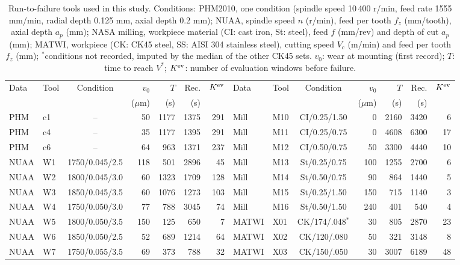 \begin{table}[!tbp]
\centering
\caption{Run-to-failure tools used in this study. Conditions: PHM2010, one condition (spindle speed 10\,400 r/min, feed rate 1555 mm/min, radial depth 0.125 mm, axial depth 0.2 mm); NUAA, spindle speed $n$ (r/min), feed per tooth $f_z$ (mm/tooth), axial depth $a_p$ (mm); NASA milling, workpiece material (CI: cast iron, St: steel), feed $f$ (mm/rev) and depth of cut $a_p$ (mm); MATWI, workpiece (CK: CK45 steel, SS: AISI 304 stainless steel), cutting speed $V_c$ (m/min) and feed per tooth $f_z$ (mm); $^\ast$conditions not recorded, imputed by the median of the other CK45 sets. $v_0$: wear at mounting (first record); $T$: time to reach $V^\ast$; $K^{\rm ev}$: number of evaluation windows before failure.}
\label{tab:data}
\scriptsize\setlength{\tabcolsep}{3.2pt}
\begin{tabular}{llcrrrr@{\hspace{10pt}}llcrrrr}
\toprule
Data & Tool & Condition & $v_0$ & $T$ & Rec. & $K^{\rm ev}$ & Data & Tool & Condition & $v_0$ & $T$ & Rec. & $K^{\rm ev}$\\
 & & & ($\mu$m) & (s) & (s) & & & & & ($\mu$m) & (s) & (s) & \\
\midrule
PHM & c1 & -- & 50 & 1177 & 1375 & 291 & Mill & M10 & CI/0.25/1.50 & 0 & 2160 & 3420 & 6\\
PHM & c4 & -- & 35 & 1177 & 1395 & 291 & Mill & M11 & CI/0.25/0.75 & 0 & 4608 & 6300 & 17\\
PHM & c6 & -- & 64 & 963 & 1371 & 237 & Mill & M12 & CI/0.50/0.75 & 50 & 3300 & 4440 & 10\\
NUAA & W1 & 1750/0.045/2.5 & 118 & 501 & 2896 & 45 & Mill & M13 & St/0.25/0.75 & 100 & 1255 & 2700 & 6\\
NUAA & W2 & 1800/0.045/3.0 & 60 & 1323 & 1709 & 128 & Mill & M14 & St/0.50/0.75 & 90 & 864 & 1440 & 5\\
NUAA & W3 & 1850/0.045/3.5 & 60 & 1076 & 1273 & 103 & Mill & M15 & St/0.25/1.50 & 150 & 715 & 1140 & 3\\
NUAA & W4 & 1750/0.050/3.0 & 77 & 788 & 3045 & 74 & Mill & M16 & St/0.50/1.50 & 240 & 401 & 540 & 4\\
NUAA & W5 & 1800/0.050/3.5 & 150 & 125 & 650 & 7 & MATWI & X01 & CK/174/.048$^\ast$ & 30 & 805 & 2870 & 23\\
NUAA & W6 & 1850/0.050/2.5 & 52 & 689 & 1214 & 64 & MATWI & X02 & CK/120/.080 & 50 & 321 & 3148 & 8\\
NUAA & W7 & 1750/0.055/3.5 & 69 & 373 & 788 & 32 & MATWI & X03 & CK/150/.050 & 30 & 3007 & 6189 & 48\\

\end{tabular}
\end{table}
